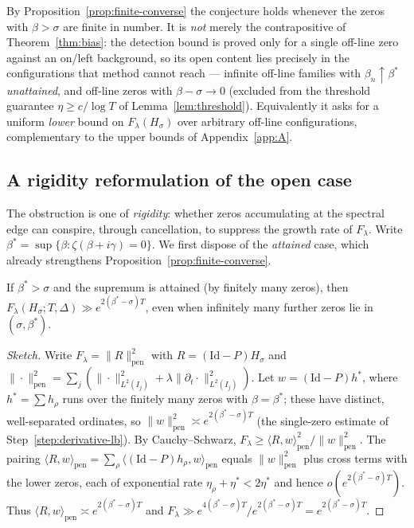 \noindent
By Proposition~\ref{prop:finite-converse} the conjecture holds whenever the zeros
with $\beta>\sigma$ are finite in number.  It is \emph{not} merely the
contrapositive of Theorem~\ref{thm:bias}: the detection bound is proved only for a
single off-line zero against an on/left background, so its open content lies
precisely in the configurations that method cannot reach --- infinite off-line
families with $\beta_n\uparrow\beta^\ast$ \emph{unattained}, and off-line zeros
with $\beta-\sigma\to0$ (excluded from the threshold guarantee $\eta\ge c/\log T$
of Lemma~\ref{lem:threshold}).  Equivalently it asks for a uniform \emph{lower}
bound on $F_\lambda(H_\sigma)$ over arbitrary off-line configurations,
complementary to the upper bounds of Appendix~\ref{app:A}.

\subsection{A rigidity reformulation of the open case}\label{subsec:rigidity}

The obstruction is one of \emph{rigidity}: whether zeros accumulating at the
spectral edge can conspire, through cancellation, to suppress the growth rate of
$F_\lambda$.  Write $\beta^\ast=\sup\{\beta:\zeta(\beta+i\gamma)=0\}$.  We first
dispose of the \emph{attained} case, which already strengthens
Proposition~\ref{prop:finite-converse}.

\begin{proposition}\label{prop:attained-edge}
If $\beta^\ast>\sigma$ and the supremum is attained \textup{(}by finitely many
zeros\textup{)}, then $F_\lambda(H_\sigma;T,\Delta)\gg e^{2(\beta^\ast-\sigma)T}$,
even when infinitely many further zeros lie in $(\sigma,\beta^\ast)$.
\end{proposition}

\begin{proof}[Sketch]
Write $F_\lambda=\|R\|_{\mathrm{pen}}^2$ with $R=(\mathrm{Id}-P)H_\sigma$ and
$\|\cdot\|_{\mathrm{pen}}^2=\sum_j(\|\cdot\|_{L^2(I_j)}^2+\lambda\|\partial_t\cdot\|_{L^2(I_j)}^2)$.
Let $w=(\mathrm{Id}-P)h^\ast$, where $h^\ast=\sum h_\rho$ runs over the finitely
many zeros with $\beta=\beta^\ast$; these have distinct, well-separated ordinates,
so $\|w\|_{\mathrm{pen}}^2\asymp e^{2(\beta^\ast-\sigma)T}$ (the single-zero
estimate of Step~\ref{step:derivative-lb}).  By Cauchy--Schwarz,
$F_\lambda\ge\langle R,w\rangle_{\mathrm{pen}}^2/\|w\|_{\mathrm{pen}}^2$.  The
pairing $\langle R,w\rangle_{\mathrm{pen}}=\sum_\rho\langle(\mathrm{Id}-P)h_\rho,w\rangle_{\mathrm{pen}}$
equals $\|w\|_{\mathrm{pen}}^2$ plus cross terms with the lower zeros, each of
exponential rate $\eta_\rho+\eta^\ast<2\eta^\ast$ and hence
$o(e^{2(\beta^\ast-\sigma)T})$.  Thus
$\langle R,w\rangle_{\mathrm{pen}}\asymp e^{2(\beta^\ast-\sigma)T}$ and
$F_\lambda\gg e^{4(\beta^\ast-\sigma)T}/e^{2(\beta^\ast-\sigma)T}=e^{2(\beta^\ast-\sigma)T}$.
\end{proof}

